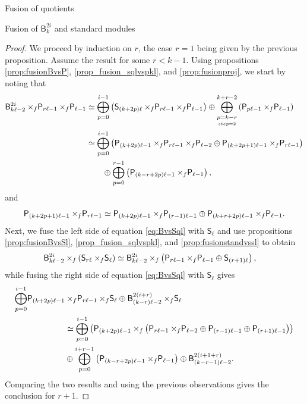 \documentclass[reqno]{amsart}
\newcommand{\ds}[1]{\mathsf S_{#1}}
\newcommand{\dP}[1]{\mathsf P_{#1}}
\newcommand{\xf}{\times\hspace{-0.27em}_f}
\newcommand{\B}[2]{\mathsf{B}^{#1}_{#2}}
\newcommand{\lc}{\ell}
\begin{document}
\begin{section}{Fusion of quotients}
\begin{subsection}{Fusion of $\B{2i}{k}$ and standard modules}
\begin{proof}
We proceed by induction on $r$, the case $r=1$ being given by the previous proposition. Assume the result for some $r<k-1$. Using propositions \ref{prop:fusionBvsP}, \ref{prop_fusion_sqlvspkl}, and \ref{prop:fusionproj}, we start by noting that
\begin{align}
	\B{2i}{k \lc -2} \xf \dP{r\lc -1} \xf \dP{\lc-1} & \simeq \overset{i-1}{\underset{p = 0}{\bigoplus}}\left(\ds{(k+2p)\lc} \xf \dP{r \lc-1} \xf \dP{\lc-1} \right)\oplus \overset{k+r-2}{\underset{\underset{step=2}{p = k-r}}{\bigoplus}}\left(\dP{p \lc -1} \xf \dP{\lc-1} \right) \notag\\
	& \simeq \overset{i-1}{\underset{p = 0}{\bigoplus}}\left(\dP{(k+2p)\lc -1} \xf \dP{r\lc -1} \xf \dP{\lc-2} \oplus \dP{(k+2p+1)\lc -1} \xf \dP{r \lc -1} \right) \notag\\
	& \qquad \oplus \overset{r-1}{\underset{p = 0}{\bigoplus}}\left(\dP{(k-r+2p)\lc -1} \xf \dP{\lc-1} \right),
\end{align}
and
\begin{equation*}
\dP{(k+2p+1)\lc-1} \xf \dP{r \lc -1} \simeq \dP{(k+2p)\lc-1} \xf \dP{(r-1)\lc-1} \oplus \dP{(k+r+2p)\lc -1}\xf \dP{\lc-1}.
\end{equation*}
Next, we fuse the left side of equation \eqref{eq:BvsSql} with $\ds{\lc}$ and use propositions \ref{prop:fusionBvsSl}, \ref{prop_fusion_sqlvspkl}, and \ref{prop:fusionstandvssl} to obtain
\begin{align}
 \B{2i}{k \lc -2} \xf \left(\ds{r \lc} \xf \ds{\lc}\right)& \simeq \B{2i}{k \lc -2} \xf \left( \dP{r\lc -1} \xf \dP{\lc-1} \oplus \ds{(r+1)\lc}\right), 
\end{align}
while fusing the right side of equation \eqref{eq:BvsSql} with $\ds{\lc}$ gives
\begin{align}
\overset{i-1}{\underset{p = 0}{\bigoplus}}\dP{(k+2p)\lc-1} & \xf \dP{r\lc-1} \xf \ds{\lc} \oplus \B{2(i+r)}{(k-r)\lc-2} \xf \ds{\lc} \notag\\
& \simeq\overset{i-1}{\underset{p = 0}{\bigoplus}}\left(\dP{(k+2p)\lc-1} \xf \left(\dP{r \lc -1} \xf \dP{\lc-2} \oplus \dP{(r-1)\lc-1} \oplus \dP{(r+1)\lc -1}\right)\right) \notag\\
& \oplus  \overset{i+r-1}{\underset{p = 0}{\bigoplus}}\left(\dP{(k-r+2p)\lc -1}\xf \dP{\lc-1}\right) \oplus \B{2(i+1+r)}{(k-r-1)\lc-2}.
\end{align}
Comparing the two results and using the previous observations gives the conclusion for $r+1$.
\end{proof}

\end{subsection}
\end{section}
\end{document}
